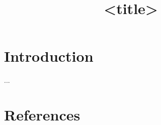 \documentclass[conference]{IEEEtran}
\begin{document}
\title{<title>}
\maketitle
\tableofcontents
\pagebreak 

\section{Introduction}

...

\section{References}
\begin{thebibliography}{00}

\end{thebibliography}
\end{document}
